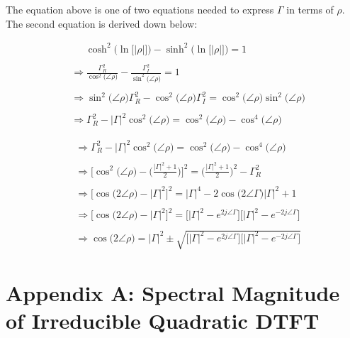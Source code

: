 \documentclass{article}
\begin{document}
The equation above is one of two equations needed to express $\Gamma$ in terms of $\rho$. The second equation is derived down below:

\begin{align*}
    & \quad \ \ \cosh^{2}\Big(\ln\big[\big|\rho\big|\big]\Big) - \sinh^{2}\Big(\ln\big[\big|\rho\big|\big]\Big) = 1 \\ \\
    & \Rightarrow \frac{\Gamma_{R}^{2}}{\cos^{2}\big(\angle{\rho}\big)} - \frac{\Gamma_{I}^{2}}{\sin^{2}\big(\angle{\rho}\big)} = 1 \\ \\
    & \Rightarrow \sin^{2}\big(\angle{\rho}\big)\Gamma_{R}^{2} - \cos^{2}\big(\angle{\rho}\big)\Gamma_{I}^{2} = \cos^{2}\big(\angle{\rho}\big)\sin^{2}\big(\angle{\rho}\big) \\ \\
    & \Rightarrow \Gamma_{R}^{2} - \big|\Gamma\big|^{2}\cos^{2}\big(\angle{\rho}\big) = \cos^{2}\big(\angle{\rho}\big) - \cos^{4}\big(\angle{\rho}\big)
  \end{align*}

\newpage

\begin{align*}
    & \Rightarrow \Gamma_{R}^{2} - \big|\Gamma\big|^{2}\cos^{2}\big(\angle{\rho}\big) = \cos^{2}\big(\angle{\rho}\big) - \cos^{4}\big(\angle{\rho}\big) \\ \\
    & \Rightarrow \Bigg[\cos^{2}\big(\angle{\rho}\big) - \Bigg(\frac{\big|\Gamma\big|^{2} + 1}{2}\Bigg)\Bigg]^{2} = \Bigg(\frac{\big|\Gamma\big|^{2} + 1}{2}\Bigg)^{2} - \Gamma_{R}^{2} \\ \\ 
    & \Rightarrow \bigg[\cos\big(2\angle{\rho}\big) - \big|\Gamma\big|^{2}\bigg]^{2} = \big|\Gamma\big|^{4} - 2\cos\big(2\angle{\Gamma}\big)|\Gamma|^{2} + 1 \\ \\
    & \Rightarrow \bigg[\cos\big(2\angle{\rho}\big) - \big|\Gamma\big|^{2}\bigg]^{2} = \bigg[\big|\Gamma\big|^{2} - e^{2j\angle{\Gamma}}\bigg]\bigg[\big|\Gamma\big|^{2} - e^{-2j\angle{\Gamma}}\bigg] \\ \\
    & \Rightarrow \cos\big(2\angle{\rho}\big) = \big|\Gamma\big|^{2} \pm \sqrt{\bigg[\big|\Gamma\big|^{2} - e^{2j\angle{\Gamma}}\bigg]\bigg[\big|\Gamma\big|^{2} - e^{-2j\angle{\Gamma}}\bigg]}
  \end{align*}

\newpage
\section*{Appendix A: Spectral Magnitude of Irreducible Quadratic DTFT}
\end{document}
